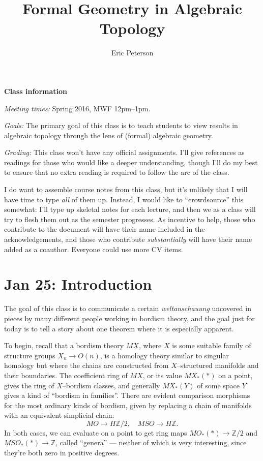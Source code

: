 \documentclass{article}
\title{Formal Geometry in Algebraic Topology}
\author{Eric Peterson}
\newcommand{\Z}{\mathbb Z}
\newcommand{\<}{\langle}
\renewcommand{\>}{\rangle}
\numberwithin{equation}{section}
\theoremstyle{plain}
\theoremstyle{definition}
\theoremstyle{remark}
\begin{document}
\maketitle

\textbf{Class information}

\vspace{2\baselineskip} \noindent \textit{Meeting times: }
Spring 2016, MWF 12pm--1pm.

\vspace{2\baselineskip} \noindent \textit{Goals: }
The primary goal of this class is to teach students to view results in algebraic topology through the lens of (formal) algebraic geometry.

\vspace{2\baselineskip} \noindent \textit{Grading: }
This class won't have any official assignments. I'll give references as readings for those who would like a deeper understanding, though I'll do my best to ensure that no extra reading is required to follow the arc of the class.

I do want to assemble course notes from this class, but it's unlikely that I will have time to type \emph{all} of them up. Instead, I would like to ``crowdsource'' this somewhat: I'll type up skeletal notes for each lecture, and then we as a class will try to flesh them out as the semester progresses. As incentive to help, those who contribute to the document will have their name included in the acknowledgements, and those who contribute \emph{substantially} will have their name added as a coauthor. Everyone could use more CV items.



\newpage

\tableofcontents

\newpage

\section{Jan 25: Introduction}

The goal of this class is to communicate a certain \textit{weltanschauung} uncovered in pieces by many different people working in bordism theory, and the goal just for today is to tell a story about one theorem where it is especially apparent.

To begin, recall that a bordism theory $MX$, where $X$ is some suitable family of structure groups $X_n \to O(n)$, is a homology theory similar to singular homology but where the chains are constructed from $X$--structured manifolds and their boundaries.  The coefficient ring of $MX$, or its value $MX_*(*)$ on a point, gives the ring of $X$--bordism classes, and generally $MX_*(Y)$ of some space $Y$ gives a kind of ``bordism in families''.  There are evident comparison morphisms for the most ordinary kinds of bordism, given by replacing a chain of manifolds with an equivalent simplicial chain: \[MO \to H\Z/2, \quad MSO \to H\Z.\] In both cases, we can evaluate on a point to get ring maps $MO_*(*) \to \Z/2$ and $MSO_*(*) \to \Z$, called ``genera'' --- neither of which is very interesting, since they're both zero in positive degrees.
\end{document}
